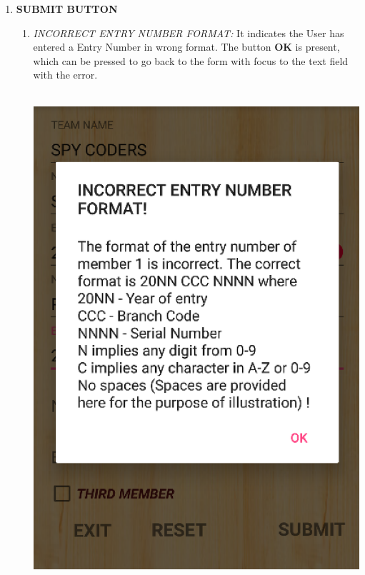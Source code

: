 \documentclass[12pt]{article}
\begin{document}
\begin{itemize}
\begin{enumerate}
\begin{minipage}{\linewidth}
            \end{minipage}
            \\
            \\
\item \textbf{SUBMIT BUTTON}
\begin{enumerate}
            \item \textit{INCORRECT ENTRY NUMBER FORMAT:} It indicates the User has entered a Entry Number in wrong format. The button \textbf{OK} is present, which can be pressed to go back to the form with focus to the text field with the error.
            \\
            \\
            \begin{minipage}{\linewidth}
	        \centering
	        \includegraphics[scale=.5]{INCORRECT_NUMBER_FORMAT}
            \end{minipage}
            

\end{enumerate}
\end{enumerate}
\end{itemize}
\end{document}
